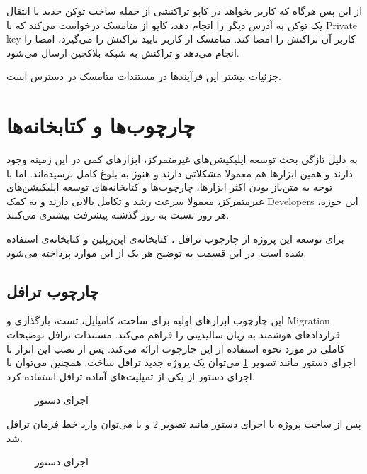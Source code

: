 از این پس هرگاه که کاربر بخواهد در کاپو تراکنشی از جمله
ساخت توکن جدید یا انتقال یک توکن به آدرس دیگر را انجام دهد،
کاپو از متامسک درخواست می‌کند که با
\gls{Private key}
کاربر آن تراکنش را امضا کند.
متامسک از کاربر تایید تراکنش را می‌گیرد، امضا را انجام می‌دهد و تراکنش به شبکه بلاکچین ارسال می‌شود.

جزئیات بیشتر این فرآیندها در مستندات متامسک
\cite{MetamaskDocs}
در دسترس است.

\section{چارچوب‌ها و کتابخانه‌ها}
به دلیل تازگی بحث توسعه اپلیکیشن‌های غیرمتمرکز،
ابزارهای کمی در این زمینه وجود دارند
و همین ابزارها هم معمولا مشکلاتی دارند و هنوز به بلوغ کامل نرسیده‌اند.
اما با توجه به متن‌باز بودن اکثر ابزارها، چارچوب‌ها و کتابخانه‌های توسعه اپلیکیشن‌های غیرمتمرکز،
معمولا سرعت رشد و تکامل بالایی دارند و به کمک
\glspl{Developer}
این حوزه، هر روز نسبت به روز گذشته پیشرفت بیشتری می‌کنند.

برای توسعه این پروژه از
چارچوب ترافل
،
کتابخانه‌ی اپن‌زپلین
و کتابخانه‌ی
استفاده شده است. در این قسمت به توضیح هر یک از این موارد پرداخته می‌شود.

\subsection{چارچوب ترافل}
این چارچوب ابزارهای اولیه برای ساخت، کامپایل، تست، بارگذاری و
\gls{Migration}
قراردادهای هوشمند به زبان سالیدیتی را فراهم می‌کند.
مستندات ترافل
\cite{TruffleDocs}
توضیحات کاملی در مورد نحوه استفاده از این چارچوب ارائه می‌کند.
پس از نصب این ابزار با اجرای دستور
مانند تصویر 
\ref{fig:truffle-init}
می‌توان یک پروژه جدید ترافل ساخت.
همچنین می‌توان با اجرای دستور
از یکی از تمپلیت‌های آماده ترافل استفاده کرد.

\begin{figure}[H]
\centerline{}
\caption{اجرای دستور }
\label{fig:truffle-init}
\end{figure}

پس از ساخت پروژه با اجرای دستور
مانند تصویر
\ref{fig:truffle-develop}
و یا
 می‌توان وارد خط فرمان ترافل شد.

\begin{figure}[H]
\centerline{}
\caption{اجرای دستور }
\label{fig:truffle-develop}
\end{figure}

